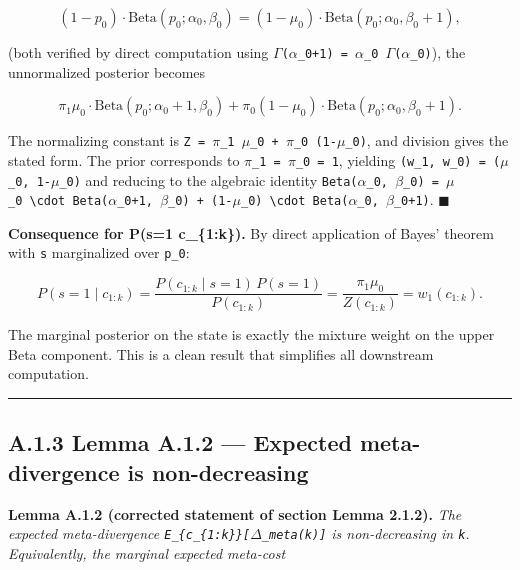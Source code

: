 \documentclass{article}
\begin{document}
\[
(1-p_0) \cdot \mathrm{Beta}(p_0; \alpha_0, \beta_0) = (1-\mu_0) \cdot \mathrm{Beta}(p_0; \alpha_0, \beta_0+1),
\]

(both verified by direct computation using
\texttt{\ensuremath{\Gamma}(\ensuremath{\alpha}\_0+1)\ =\ \ensuremath{\alpha}\_0\ \ensuremath{\Gamma}(\ensuremath{\alpha}\_0)}), the unnormalized posterior
becomes

\[
\pi_1 \mu_0 \cdot \mathrm{Beta}(p_0; \alpha_0+1, \beta_0) + \pi_0 (1-\mu_0) \cdot \mathrm{Beta}(p_0; \alpha_0, \beta_0+1).
\]

The normalizing constant is
\texttt{Z\ =\ \ensuremath{\pi}\_1\ \ensuremath{\mu}\_0\ +\ \ensuremath{\pi}\_0\ (1-\ensuremath{\mu}\_0)}, and division gives the
stated form. The prior corresponds to \texttt{\ensuremath{\pi}\_1\ =\ \ensuremath{\pi}\_0\ =\ 1},
yielding \texttt{(w\_1,\ w\_0)\ =\ (\ensuremath{\mu}\_0,\ 1-\ensuremath{\mu}\_0)} and reducing to the
algebraic identity
\texttt{Beta(\ensuremath{\alpha}\_0,\ \ensuremath{\beta}\_0)\ =\ \ensuremath{\mu}\_0\ \textbackslash{}cdot\ Beta(\ensuremath{\alpha}\_0+1,\ \ensuremath{\beta}\_0)\ +\ (1-\ensuremath{\mu}\_0)\ \textbackslash{}cdot\ Beta(\ensuremath{\alpha}\_0,\ \ensuremath{\beta}\_0+1)}.
\ensuremath{\blacksquare}

\textbf{Consequence for P(s=1 \textbar{} c\_\{1:k\}).} By direct
application of Bayes' theorem with \texttt{s} marginalized over
\texttt{p\_0}:

\[
P(s = 1 \mid c_{1:k}) = \frac{P(c_{1:k} \mid s=1) \, P(s=1)}{P(c_{1:k})} = \frac{\pi_1 \mu_0}{Z(c_{1:k})} = w_1(c_{1:k}).
\]

The marginal posterior on the state is exactly the mixture weight on the
upper Beta component. This is a clean result that simplifies all
downstream computation.

\begin{center}\rule{0.5\linewidth}{0.5pt}\end{center}

\subsection{A.1.3 Lemma A.1.2 --- Expected meta-divergence is
non-decreasing}\label{a.1.3-lemma-a.1.2-expected-meta-divergence-is-non-decreasing}

\textbf{Lemma A.1.2 (corrected statement of section Lemma 2.1.2).}
\emph{The expected meta-divergence
\texttt{E\_\{c\_\{1:k\}\}{[}\ensuremath{\Delta}\_meta(k){]}} is non-decreasing in
\texttt{k}. Equivalently, the marginal expected meta-cost}
\end{document}
